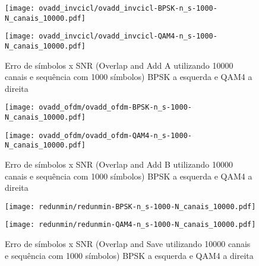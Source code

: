 \documentclass[a4paper,twoside]{articlewithlogo}
\begin{document}

\begin{figure}[H]
    \centering
    \begin{minipage}{.5\textwidth}
        \centering
        \texttt{[image: ovadd\_invcicl/ovadd\_invcicl-BPSK-n\_s-1000-N\_canais\_10000.pdf]}
    \end{minipage}%
    \begin{minipage}{0.5\textwidth}
        \centering
        \texttt{[image: ovadd\_invcicl/ovadd\_invcicl-QAM4-n\_s-1000-N\_canais\_10000.pdf]}
    \end{minipage}
    \caption{Erro de símbolos x SNR (Overlap and Add A utilizando 10000 canais e sequência com 1000 símbolos) BPSK a esquerda e QAM4 a direita}
        \label{fig:ovadd_invcicl-n_s-1000-N_canais_10000}
\end{figure}



\begin{figure}[H]
    \centering
    \begin{minipage}{.5\textwidth}
        \centering
        \texttt{[image: ovadd\_ofdm/ovadd\_ofdm-BPSK-n\_s-1000-N\_canais\_10000.pdf]}
    \end{minipage}%
    \begin{minipage}{0.5\textwidth}
        \centering
        \texttt{[image: ovadd\_ofdm/ovadd\_ofdm-QAM4-n\_s-1000-N\_canais\_10000.pdf]}
    \end{minipage}
    \caption{Erro de símbolos x SNR (Overlap and Add B utilizando 10000 canais e sequência com 1000 símbolos) BPSK a esquerda e QAM4 a direita}
    \label{fig:ovadd_ofdm-n_s-1000-N_canais_10000}
\end{figure}



\begin{figure}[H]
    \centering
    \begin{minipage}{.5\textwidth}
        \centering
        \texttt{[image: redunmin/redunmin-BPSK-n\_s-1000-N\_canais\_10000.pdf]}
    \end{minipage}%
    \begin{minipage}{0.5\textwidth}
        \centering
        \texttt{[image: redunmin/redunmin-QAM4-n\_s-1000-N\_canais\_10000.pdf]}
    \end{minipage}
    \caption{Erro de símbolos x SNR (Overlap and Save utilizando 10000 canais e sequência com 1000 símbolos) BPSK a esquerda e QAM4 a direita}
    \label{fig:redunmin-n_s-1000-N_canais_10000}
\end{figure}
\end{document}
